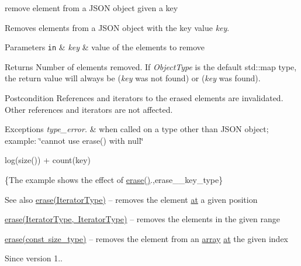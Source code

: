 remove element from a J\+S\+ON object given a key 

Removes elements from a J\+S\+ON object with the key value {\itshape key}.


\begin{DoxyParams}[1]{Parameters}
\mbox{\tt in}  & {\em key} & value of the elements to remove\\
\hline
\end{DoxyParams}
\begin{DoxyReturn}{Returns}
Number of elements removed. If {\itshape Object\+Type} is the default {\ttfamily std\+::map} type, the return value will always be {} ({\itshape key} was not found) or {} ({\itshape key} was found).
\end{DoxyReturn}
\begin{DoxyPostcond}{Postcondition}
References and iterators to the erased elements are invalidated. Other references and iterators are not affected.
\end{DoxyPostcond}

\begin{DoxyExceptions}{Exceptions}
{\em type\+\_\+error.} & when called on a type other than J\+S\+ON object; example\+: {\ttfamily \char`\"{}cannot use erase() with null\char`\"{}}\\
\hline
\end{DoxyExceptions}
{\ttfamily log(size()) + count(key)}

\{The example shows the effect of {\ttfamily \mbox{\hyperlink{classnlohmann_1_1basic__json_a068a16e76be178e83da6a192916923ed}{erase()}}}.,erase\+\_\+\+\_\+key\+\_\+type\}

\begin{DoxySeeAlso}{See also}
\mbox{\hyperlink{classnlohmann_1_1basic__json_a068a16e76be178e83da6a192916923ed}{erase(\+Iterator\+Type)}} -- removes the element \mbox{\hyperlink{classnlohmann_1_1basic__json_a73ae333487310e3302135189ce8ff5d8}{at}} a given position 

\mbox{\hyperlink{classnlohmann_1_1basic__json_a4b3f7eb2d4625d95a51fbbdceb7c5f39}{erase(\+Iterator\+Type, Iterator\+Type)}} -- removes the elements in the given range 

\mbox{\hyperlink{classnlohmann_1_1basic__json_a88cbcefe9a3f4d294bed0653550a5cb9}{erase(const size\+\_\+type)}} -- removes the element from an \mbox{\hyperlink{classnlohmann_1_1basic__json_aa80485befaffcadaa39965494e0b4d2e}{array}} \mbox{\hyperlink{classnlohmann_1_1basic__json_a73ae333487310e3302135189ce8ff5d8}{at}} the given index
\end{DoxySeeAlso}
\begin{DoxySince}{Since}
version 1.. 
\end{DoxySince}
\mbox{\label{classnlohmann_1_1basic__json_a88cbcefe9a3f4d294bed0653550a5cb9}} 
